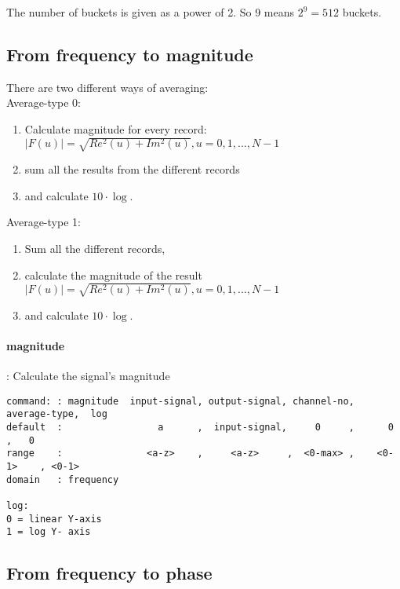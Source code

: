 \documentclass{report}
\newcommand{\bc}{\scriptsize}
\newcommand{\ec}{\normalsize}
\begin{document}
The number of buckets is given as a power of 2. So 9 means $2^9=512$ buckets.

\subsection{From frequency to magnitude}\label{sec:freqtomag}

There are two different ways of averaging:\\

Average-type 0:

\begin{enumerate}
\item Calculate magnitude for every record:\\
       \( |F(u)| = \sqrt{ Re^{2}(u) + Im^{2}(u) } , u = 0,1,...,N-1 \)
\item sum all the results from the different records
\item and calculate \( 10\cdot\log \).
\end{enumerate}

Average-type 1:

\begin{enumerate}
\item Sum all the different records,
\item calculate the magnitude of the result\\
   \( |F( u)| = \sqrt{ Re^{2}( u) + Im^{2}( u) } , u = 0,1,...,N-1 \)
\item and calculate \( 10\cdot\log \).
\end{enumerate}
\paragraph{magnitude}: Calculate the signal's magnitude

\bc
\begin{verbatim}
command: : magnitude  input-signal, output-signal, channel-no, average-type,  log
default  :                 a      ,  input-signal,     0     ,      0      ,   0
range    :               <a-z>    ,     <a-z>     ,  <0-max> ,    <0-1>    , <0-1>
domain   : frequency

log:
0 = linear Y-axis
1 = log Y- axis
\end{verbatim}
\ec

\subsection{From frequency to phase}\label{sec:freqtophas}
\end{document}
